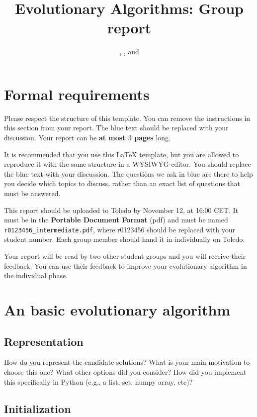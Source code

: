 \documentclass[a4paper,10pt]{article}
\title{Evolutionary Algorithms: Group report}
\author{\ReplaceMe{Group Member 1}, \ReplaceMe{Group Member 2}, and \ReplaceMe{Group Member 3}}
\newcommand{\thisyear}{\the\year}
\newcommand{\deadlineGroup}{November 12, \thisyear{} at 16:00 CET}
\newcommand{\ReplaceMe}[1]{{\color{blue}#1}}
\begin{document}
\selectfont{}

\maketitle

\section*{Formal requirements}

Please respect the structure of this template. You can remove the instructions in this section from your report. The blue text should be replaced with your discussion. Your report can be \textbf{at most $3$ pages} long. 

It is recommended that you use this \LaTeX{} template, but you are allowed to reproduce it with the same structure in a WYSIWYG-editor. You should replace the blue text with your discussion. The questions we ask in blue are there to help you decide which topics to discuss, rather than an exact list of questions that must be answered.

This report should be uploaded to Toledo by \deadlineGroup. It must be in the \textbf{Portable Document Format} (pdf) and must be named \texttt{r0123456\_intermediate.pdf}, where r0123456 should be replaced with your student number. Each group member should hand it in individually on Toledo.

Your report will be read by two other student groups and you will receive their feedback. You can use their feedback to improve your evolutionary algorithm in the individual phase.


\section{An basic evolutionary algorithm} 

\subsection{Representation}

\ReplaceMe{How do you represent the candidate solutions? What is your main motivation to choose this one? What other options did you consider? How did you implement this specifically in Python (e.g., a list, set, numpy array, etc)?}

\subsection{Initialization}
\end{document}
